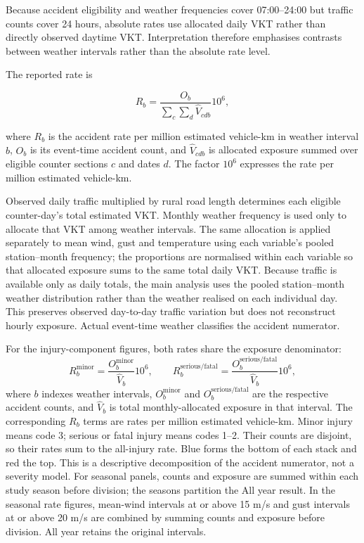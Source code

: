 Because accident eligibility and weather frequencies cover 07:00--24:00 but traffic counts cover 24 hours, absolute rates use allocated daily VKT rather than directly observed daytime VKT. Interpretation therefore emphasises contrasts between weather intervals rather than the absolute rate level.

\noindent\begin{minipage}{\linewidth}
\setlength{\parskip}{0.5\baselineskip}
The reported rate is

\begin{equation}
\label{eq:monthly-rate}
R_b=\frac{O_b}{\sum_c\sum_d\widehat V_{cdb}}10^6,
\end{equation}

where \(R_b\) is the accident rate per million estimated vehicle-km in weather interval
\(b\), \(O_b\) is its event-time accident count, and \(\widehat V_{cdb}\)
is allocated exposure summed over eligible counter sections \(c\) and dates
\(d\). The factor \(10^6\) expresses the rate per million estimated vehicle-km.
\end{minipage}

Observed daily traffic multiplied by rural road length determines each eligible
counter-day's total estimated VKT. Monthly weather frequency is used only to
allocate that VKT among weather intervals. The same allocation is applied separately to mean wind, gust and temperature using each variable's pooled station--month frequency; the proportions are normalised within each variable so that allocated exposure sums to the same total daily VKT. Because traffic is available only as
daily totals, the main analysis uses the pooled station--month weather
distribution rather than the weather realised on each individual day. This
preserves observed day-to-day traffic variation but does not reconstruct hourly
exposure. Actual event-time weather classifies the accident numerator.

For the injury-component figures, both rates share the exposure denominator:
\begin{equation}
\label{eq:injury-rates}
R_b^{\mathrm{minor}}=\frac{O_b^{\mathrm{minor}}}{\widehat V_b}10^6,
\qquad
R_b^{\mathrm{serious/fatal}}=\frac{O_b^{\mathrm{serious/fatal}}}{\widehat V_b}10^6,
\end{equation}
where \(b\) indexes weather intervals, \(O_b^{\mathrm{minor}}\) and
\(O_b^{\mathrm{serious/fatal}}\) are the respective accident counts, and
\(\widehat V_b\) is total monthly-allocated exposure in that interval.
The corresponding \(R_b\) terms are rates per million estimated vehicle-km.
Minor injury means code 3; serious or fatal injury means codes 1--2. Their
counts are disjoint, so their rates sum to the all-injury rate. Blue forms
the bottom of each stack and red the top. This is a descriptive decomposition
of the accident numerator, not a severity model. For seasonal panels, counts
and exposure are summed within each study season before division; the seasons
partition the All year result. In the seasonal rate figures, mean-wind
intervals at or above 15 m/s and gust intervals at or above 20 m/s are combined
by summing counts and exposure before division. All year retains the original intervals.

